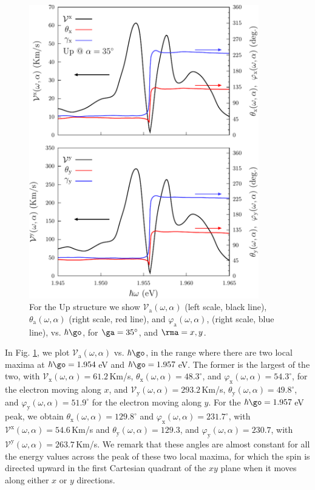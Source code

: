 \documentclass[floatfix,prb,aps,superscriptaddress,showpacs,11pt,preprint,letterpaper]{revtex4}
\def\tama{10cm}
\begin{document}
\begin{figure}[t]
\centering
\includegraphics[width=\tama]{upplots/up-vx-vy-w2}
\caption{For the Up structure we show $\mathcal{V}_{\mathrm{a}}
(\omega,\alpha)$ (left scale, black line), $\theta_{\mathrm{a}}
(\omega,\alpha)$ (right scale, red line), and $\varphi_{\mathrm{a}}
(\omega,\alpha)$, (right scale, blue line), vs. $\hbar\go$, for
$\ga=35^\circ$, and $\rma=x,y$. }
\label{fig:up-vx-vy-w2}
\end{figure}
In Fig. \ref{fig:up-vx-vy-w2}, we plot $\mathcal{V}_{\mathrm{a}}
(\omega,\alpha)$ vs. $\hbar\go$, in the range where there are two local maxima
at $\hbar\go=1.954$\,eV and $\hbar\go=1.957$\,eV.
% 
The former is the largest of the two, with
$\mathcal{V}_{\mathrm{x}} (\omega,\alpha)=61.2$\,Km/s,
$\theta_{\mathrm{x}} (\omega,\alpha)=48.3^{\circ}$, and 
$\varphi_{\mathrm{x}} (\omega,\alpha)=54.3^{\circ}$,
for the electron moving along $x$, and
$\mathcal{V}_{\mathrm{y}} (\omega,\alpha)=293.2$\,Km/s,
$\theta_{\mathrm{y}} (\omega,\alpha)=49.8^{\circ}$, and 
$\varphi_{\mathrm{y}} (\omega,\alpha)=51.9^{\circ}$
for the electron moving along $y$.
% 
For the $\hbar\go=1.957$\,eV peak, we obtain 
$\theta_{\mathrm{x}} (\omega,\alpha) = 129.8^{\circ}$ and 
$\varphi_{\mathrm{x}} (\omega,\alpha) = 231.7^{\circ}$, with 
$\mathcal{V}^{\mathrm{x}} (\omega,\alpha) = 54.6$\,Km/s and
$\theta_{\mathrm{y}}(\omega,\alpha) =129.3$, and
$\varphi_{\mathrm{y}}(\omega,\alpha) = 230.7$, with 
$\mathcal{V}^{\mathrm{y}} (\omega,\alpha) = 263.7$\,Km/s.
We remark that these angles are almost
constant for all the energy values across the peak of these two local maxima, for
which the spin is directed upward in the first Cartesian quadrant of the $xy$
plane when it moves along either $x$ or $y$ directions. 
\end{document}
